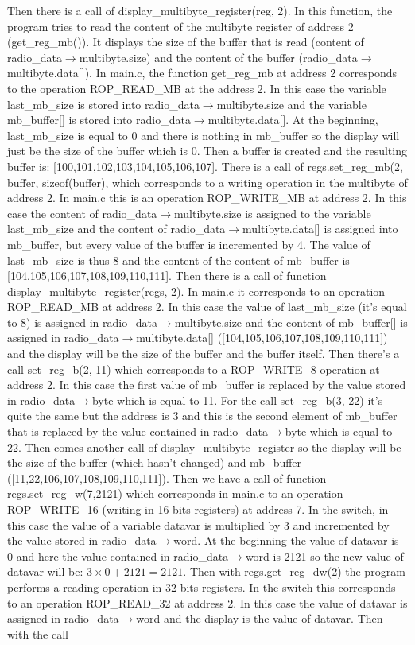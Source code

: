 \documentclass[11pt]{article}
\begin{document}
Then there is a call of display\_multibyte\_register(reg, 2). In this function, the program tries to read the content of the multibyte register of address 2 (get\_reg\_mb()). It displays the size of the buffer that is read (content of radio\_data${\rightarrow}$multibyte.size) and the content of the buffer (radio\_data${\rightarrow}$multibyte.data[]). In main.c, the function get\_reg\_mb at address 2 corresponds to the operation ROP\_READ\_MB at the address 2. In this case the variable last\_mb\_size is stored into radio\_data${\rightarrow}$multibyte.size and the variable mb\_buffer[] is stored into radio\_data${\rightarrow}$multibyte.data[]. At the beginning, last\_mb\_size is equal to 0 and there is nothing in mb\_buffer so the display will just be the size of the buffer which is 0. Then a buffer is created and the resulting buffer is: [100,101,102,103,104,105,106,107]. There is a call of regs.set\_reg\_mb(2, buffer, sizeof(buffer), which corresponds to a writing operation in the multibyte of address 2. In main.c this is an operation ROP\_WRITE\_MB at address 2. In this case the content of radio\_data${\rightarrow}$multibyte.size is assigned to the variable last\_mb\_size and the content of radio\_data${\rightarrow}$multibyte.data[] is assigned into mb\_buffer, but every value of the buffer is incremented by 4. The value of last\_mb\_size is thus 8 and the content of the content of mb\_buffer is [104,105,106,107,108,109,110,111]. Then there is a call of function display\_multibyte\_register(regs, 2). In main.c it corresponds to an operation ROP\_READ\_MB at address 2. In this case the value of last\_mb\_size (it's equal to 8) is assigned in radio\_data${\rightarrow}$multibyte.size and the content of mb\_buffer[] is assigned in radio\_data${\rightarrow}$multibyte.data[] ([104,105,106,107,108,109,110,111]) and the display will be the size of the buffer and the buffer itself. Then there's a call set\_reg\_b(2, 11) which corresponds to a ROP\_WRITE\_8 operation at address 2. In this case the first value of mb\_buffer is replaced by the value stored in radio\_data${\rightarrow}$byte which is equal to 11. For the call set\_reg\_b(3, 22) it's quite the same but the address is 3 and this is the second element of mb\_buffer that is replaced by the value contained in radio\_data${\rightarrow}$byte which is equal to 22. Then comes another call of display\_multibyte\_register so the display will be the size of the buffer (which hasn't changed) and mb\_buffer ([11,22,106,107,108,109,110,111]). Then we have a call of function regs.set\_reg\_w(7,2121) which corresponds in main.c to an operation ROP\_WRITE\_16 (writing in 16 bits registers) at address 7. In the switch, in this case the value of a variable datavar is multiplied by 3 and incremented by the value stored in radio\_data${\rightarrow}$word. At the beginning the value of datavar is 0 and here the value contained in radio\_data${\rightarrow}$word is 2121 so the new value of datavar will be: ${3\times0 + 2121 = 2121}$. Then with regs.get\_reg\_dw(2) the program performs a reading operation in 32-bits registers. In the switch this corresponds to an operation ROP\_READ\_32 at address 2. In this case the value of datavar is assigned in radio\_data${\rightarrow}$word and the display is the value of datavar. Then with the call 
\end{document}
